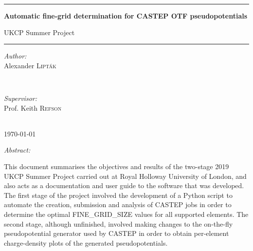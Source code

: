\documentclass[article]{revtex4}
\begin{document}
\begin{titlepage}
\begin{center}
\vspace*{2cm}

\noindent\rule{\textwidth}{1pt}\vspace{0.5cm}

{\Large \textbf{Automatic fine-grid determination for CASTEP OTF pseudopotentials}}

\vspace{0.5cm}

{\large UKCP Summer Project}

\vspace{0.5cm}\noindent\rule{\textwidth}{1pt}

\vspace{1cm}

\begin{minipage}{0.4\textwidth}
\begin{flushleft} \large
\emph{Author:}\\
Alexander \textsc{Lipták}
\end{flushleft}
\end{minipage}
~
\begin{minipage}{0.4\textwidth}
\begin{flushright} \large
\emph{Supervisor:} \\
Prof. Keith \textsc{Refson}
\end{flushright}
\end{minipage}\\[1cm]

{\large \today}

\vspace{2cm}
    
{\large \emph{Abstract:}}

\vspace{0.5cm}

\begin{justify}
{
This document summarises the objectives and results of the two-stage 2019 UKCP Summer Project carried out at Royal Holloway University of London, and also acts as a documentation and user guide to the software that was developed. The first stage of the project involved the development of a Python script to automate the creation, submission and analysis of CASTEP jobs in order to determine the optimal FINE\_GRID\_SIZE values for all supported elements. The second stage, although unfinished, involved making changes to the on-the-fly pseudopotential generator used by CASTEP in order to obtain per-element charge-density plots of the generated pseudopotentials.
}
\end{justify}


\end{center}
\end{titlepage}
\end{document}
